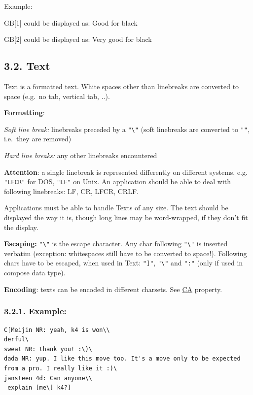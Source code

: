 Example:

GB{[}1{]} could be displayed as: Good for black

GB{[}2{]} could be displayed as: Very good for black

\subsection{3.2. Text}\label{text}

Text is a formatted text. White spaces other than linebreaks are
converted to space (e.g.~no tab, vertical tab, ..).

\textbf{Formatting}:

\emph{Soft line break:} linebreaks preceded by a
\texttt{"\textbackslash{}"} (soft linebreaks are converted to
\texttt{""}, i.e.~they are removed)

\emph{Hard line breaks:} any other linebreaks encountered

\textbf{Attention}: a single linebreak is represented differently on
different systems, e.g. \texttt{"LFCR"} for DOS, \texttt{"LF"} on Unix.
An application should be able to deal with following linebreaks: LF, CR,
LFCR, CRLF.

Applications must be able to handle Texts of any size. The text should
be displayed the way it is, though long lines may be word-wrapped, if
they don't fit the display.

\textbf{Escaping:} \texttt{"\textbackslash{}"} is the escape character.
Any char following \texttt{"\textbackslash{}"} is inserted verbatim
(exception: whitespaces still have to be converted to space!). Following
chars have to be escaped, when used in Text: \texttt{"{]}"},
\texttt{"\textbackslash{}"} and \texttt{":"} (only if used in compose
data type).

\textbf{Encoding}: texts can be encoded in different charsets. See
\href{https://red-bean.com/sgf/properties.html\#CA}{CA} property.

\subsubsection{3.2.1. Example:}\label{example}

\begin{verbatim}
C[Meijin NR: yeah, k4 is won\\
derful\
sweat NR: thank you! :\)\
dada NR: yup. I like this move too. It's a move only to be expected from a pro. I really like it :)\
jansteen 4d: Can anyone\\
 explain [me\] k4?]
\end{verbatim}

